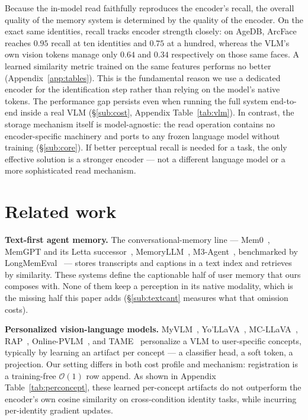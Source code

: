 Because the in-model read faithfully reproduces the encoder's recall, the overall quality of the memory system is determined by the quality of the encoder. On the exact same identities, recall tracks encoder strength closely: on AgeDB, ArcFace reaches $0.95$ recall at ten identities and $0.75$ at a hundred, whereas the VLM's own vision tokens manage only $0.64$ and $0.34$ respectively on those same faces. A learned similarity metric trained on the same features performs no better (Appendix~\ref{app:tables}). This is the fundamental reason we use a dedicated encoder for the identification step rather than relying on the model's native tokens. The performance gap persists even when running the full system end-to-end inside a real VLM (\S\ref{sub:cost}, Appendix Table~\ref{tab:vlm}). In contrast, the storage mechanism itself is model-agnostic: the read operation contains no encoder-specific machinery and ports to any frozen language model without training (\S\ref{sub:core}). If better perceptual recall is needed for a task, the only effective solution is a stronger encoder --- not a different language model or a more sophisticated read mechanism.


\section{Related work}
\label{sec:related}

\textbf{Text-first agent memory.} The conversational-memory line --- Mem0~\citep{mem0}, MemGPT and its Letta successor~\citep{memgpt,letta}, MemoryLLM~\citep{memllm}, M3-Agent~\citep{m3agent}, benchmarked by LongMemEval~\citep{longmemeval} --- stores transcripts and captions in a text index and retrieves by similarity. These systems define the captionable half of user memory that ours composes with. None of them keep a perception in its native modality, which is the missing half this paper adds (\S\ref{sub:textcant} measures what that omission costs).

\textbf{Personalized vision-language models.} MyVLM~\citep{myvlm}, Yo'LLaVA~\citep{yollava}, MC-LLaVA~\citep{mcllava}, RAP~\citep{rap}, Online-PVLM~\citep{onlinepvlm}, and TAME~\citep{tame} personalize a VLM to user-specific concepts, typically by learning an artifact per concept --- a classifier head, a soft token, a projection. Our setting differs in both cost profile and mechanism: registration is a training-free $\mathcal{O}(1)$ row append. As shown in Appendix Table~\ref{tab:perconcept}, these learned per-concept artifacts do not outperform the encoder's own cosine similarity on cross-condition identity tasks, while incurring per-identity gradient updates.


